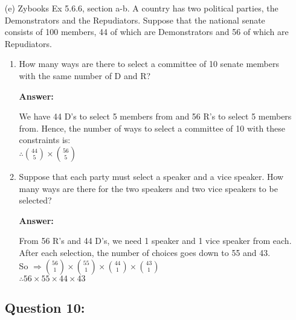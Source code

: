 \documentclass[14pt]{extreport}
\newcommand{\answer}[0]{\medskip \textbf{Answer:} \medskip}
\begin{document}
\begin{enumerate}[label=(\alph*)]
\begin{enumerate}
        \answer
        
        There are 13 ranks, we can pick 5 distinct ranks, so $\rightarrow \binom{13}{5}$ \\
        For each rank, there are four suits, we pick 1 of the 4. We do this once for each card (so five times) $\rightarrow \binom{4}{1} \times 5$ \\
        $\therefore \binom{13}{5} \times  4^{5}$\\

\end{enumerate}

\item[(e)] Zybooks Ex 5.6.6, section a-b. A country has two political parties, the Demonstrators and the Repudiators. Suppose that the national senate consists of 100 members, 44 of which are Demonstrators and 56 of which are Repudiators. 

\begin{enumerate}
    \item How many ways are there to select a committee of 10 senate members with the same number of D and R? 
    
        \answer
        
        We have 44 D's to select 5 members from and 56 R's to select 5 members from. Hence, the number of ways to select a committee of 10 with these constraints is:\\
        $\therefore \binom{44}{5} \times \binom{56}{5}$\\
    
    \item Suppose that each party must select a speaker and a vice speaker. How many ways are there for the two speakers and two vice speakers to be selected?
    
        \answer
        
        From 56 R's and 44 D's, we need 1 speaker and 1 vice speaker from each. After each selection, the number of choices goes down to 55 and 43.\\
        So $\Rightarrow \binom{56}{1} \times \binom{55}{1} \times \binom{44}{1} \times \binom{43}{1}$\\
        $\therefore 56 \times 55 \times 44 \times 43$

\end{enumerate}
\newpage

\subsection*{Question 10:}
    

\end{enumerate}
\end{document}
